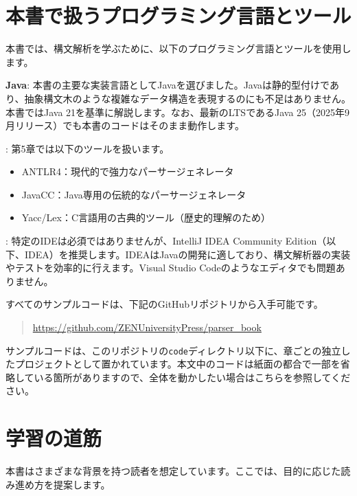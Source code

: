 \section*{本書で扱うプログラミング言語とツール}

本書では、構文解析を学ぶために、以下のプログラミング言語とツールを使用します。

\textbf{\sffamily Java}:
本書の主要な実装言語としてJavaを選びました。Javaは静的型付けであり、抽象構文木のような複雑なデータ構造を表現するのにも不足はありません。本書ではJava
21を基準に解説します。なお、最新のLTSであるJava
25（2025年9月リリース）でも本書のコードはそのまま動作します。

: 第5章では以下のツールを扱います。

\begin{itemize}
\item
  ANTLR4：現代的で強力なパーサージェネレータ
\item
  JavaCC：Java専用の伝統的なパーサージェネレータ
\item
  Yacc/Lex：C言語用の古典的ツール（歴史的理解のため）
\end{itemize}

: 特定のIDEは必須ではありませんが、IntelliJ IDEA
Community Edition（以下、IDEA）を推奨します。IDEAはJavaの開発に適しており、構文解析器の実装やテストを効率的に行えます。Visual Studio Codeのようなエディタでも問題ありません。

すべてのサンプルコードは、下記のGitHubリポジトリから入手可能です。

\begin{quote}
\url{https://github.com/ZENUniversityPress/parser_book}
\end{quote}

サンプルコードは、このリポジトリの\texttt{code}ディレクトリ以下に、章ごとの独立したプロジェクトとして置かれています。本文中のコードは紙面の都合で一部を省略している箇所がありますので、全体を動かしたい場合はこちらを参照してください。

\section*{学習の道筋}

本書はさまざまな背景を持つ読者を想定しています。ここでは、目的に応じた読み進め方を提案します。

\noindent{}

